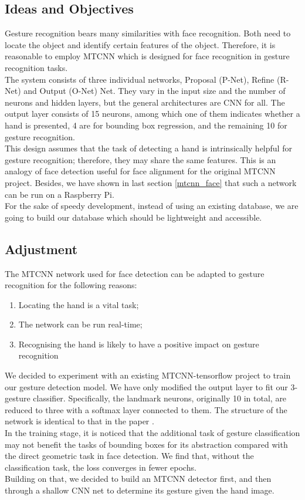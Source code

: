 \subsection{Ideas and Objectives}
Gesture recognition bears many similarities with face recognition. Both need to locate the object and identify certain features of the object. Therefore, it is reasonable to employ MTCNN which is designed for face recognition in gesture recognition tasks.\\[.2in]
The system consists of three individual networks, Proposal (P-Net), Refine (R-Net) and Output (O-Net) Net. They vary in the input size and the number of neurons and hidden layers, but the general architectures are CNN for all. The output layer consists of 15 neurons, among which one of them indicates whether a hand is presented, 4 are for bounding box regression, and the remaining 10 for gesture recognition.\cite{7553523}\\[.2in]
This design assumes that the task of detecting a hand is intrinsically helpful for gesture recognition; therefore, they may share the same features. This is an analogy of face detection useful for face alignment for the original MTCNN project. Besides, we have shown in last section \ref{mtcnn_face} that such a network can be run on a Raspberry Pi. \\[.2in]
For the sake of speedy development, instead of using an existing database, we are going to build our database which should be lightweight and accessible.
\subsection{Adjustment}
The MTCNN network used for face detection can be adapted to gesture recognition for the following reasons:
\begin{enumerate}
    \item Locating the hand is a vital task;
    \item The network can be run real-time;
    \item Recognising the hand is likely to have a positive impact on gesture recognition
\end{enumerate}
We decided to experiment with an existing MTCNN-tensorflow project \cite{PytorchMTCNN} to train our gesture detection model. We have only modified the output layer to fit our 3-gesture classifier. Specifically, the landmark neurons, originally 10 in total, are reduced to three with a softmax layer connected to them. The structure of the network is identical to that in the paper \cite{7553523}.\\[.2in]
In the training stage, it is noticed that the additional task of gesture classification may not benefit the tasks of bounding boxes for its abstraction compared with the direct geometric task in face detection. We find that, without the classification task, the loss converges in fewer epochs.\\[.2in]
Building on that, we decided to build an MTCNN detector first, and then through a shallow CNN net to determine its gesture given the hand image.
